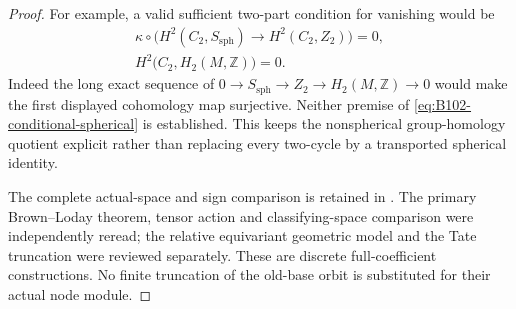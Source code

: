 \begin{proof}
For example, a valid sufficient two-part condition for vanishing
would be
\begin{equation}\label{eq:B102-conditional-spherical}
 \begin{gathered}
 \kappa\circ\bigl(H^2(C_2,S_{\mathrm{sph}})
                      \to H^2(C_2,Z_2)\bigr)=0,\\
 H^2\bigl(C_2,H_2(M,\mathbb Z)\bigr)=0.
 \end{gathered}
\end{equation}
Indeed the long exact sequence of
$0\to S_{\mathrm{sph}}\to Z_2\to H_2(M,\mathbb Z)\to0$
would make the first displayed cohomology map surjective.
Neither premise of \eqref{eq:B102-conditional-spherical} is
established. This keeps the nonspherical group-homology quotient
explicit rather than replacing every two-cycle by a transported
spherical identity.

\begingroup\raggedright
The complete actual-space and sign comparison is retained in
.
The primary Brown--Loday theorem, tensor action and classifying-space
comparison were independently reread; the relative equivariant
geometric model and the Tate truncation were reviewed separately.
These are discrete full-coefficient constructions. No finite
truncation of the old-base orbit is substituted for their
actual node module.\par
\endgroup
\end{proof}
